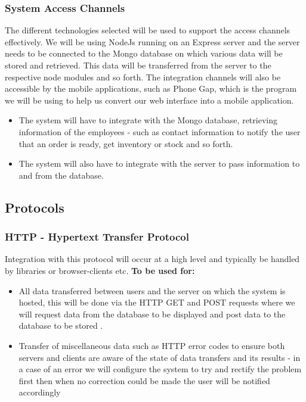 \documentclass[a4paper,12pt]{article}
\begin{document}
\subsubsection{System Access Channels}
The different technologies selected will be used to support the access channels effectively. We will be using NodeJs running on an Express server and the server needs to be connected to the Mongo database on which various data will be stored and retrieved. This data will be transferred from the server to the respective node modules and so forth. 
The integration channels will also be accessible by the mobile applications, such as Phone Gap, which is the program we will be using to help us convert our web interface into a mobile application.
\begin{itemize}

\item The system will have to integrate with the Mongo database, retrieving information of the employees - such as contact information to notify the user that an order is ready, get inventory or stock and so forth. 

\item The system will also have to integrate with the server to pass information to and from the database.
\end{itemize}

\subsection{Protocols}
\subsubsection{HTTP - Hypertext Transfer Protocol}
Integration with this protocol will occur at a high level and typically be handled by libraries or browser-clients etc.
\textbf{To be used for:	}
	\begin{itemize}
	\item{All data transferred between users and the server on which the system is hosted, this will be done via the HTTP GET and 
	         POST requests where we will request data from the database  to be displayed and post data to the database to be 
		stored .}
	\item{Transfer of miscellaneous data such as HTTP error codes to ensure both servers and clients are aware of the state of 	
		data transfers and its results - in a case of an error we will configure the system to try and rectify the problem first then 
		when no correction could be made the user will be notified accordingly }
	\end{itemize}
	
\end{document}
